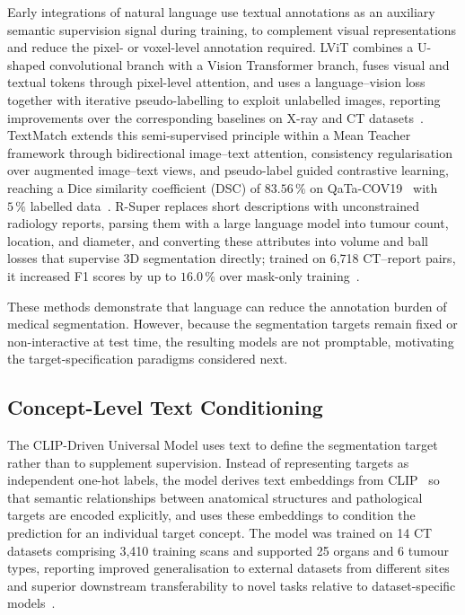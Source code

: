 Early integrations of natural language use textual annotations as an auxiliary semantic supervision signal during training, to complement visual representations and reduce the pixel- or voxel-level annotation required. LViT combines a U-shaped convolutional branch with a Vision Transformer branch, fuses visual and textual tokens through pixel-level attention, and uses a language--vision loss together with iterative pseudo-labelling to exploit unlabelled images, reporting improvements over the corresponding baselines on X-ray and CT datasets~\cite{li2023lvitlanguagemeetsvision}. TextMatch extends this semi-supervised principle within a Mean Teacher framework through bidirectional image--text attention, consistency regularisation over augmented image--text views, and pseudo-label guided contrastive learning, reaching a Dice similarity coefficient (DSC) of $83.56\,\%$ on QaTa-COV19~\cite{Degerli_2022} with $5\,\%$ labelled data~\cite{textmatch2024}. R-Super replaces short descriptions with unconstrained radiology reports, parsing them with a large language model into tumour count, location, and diameter, and converting these attributes into volume and ball losses that supervise 3D segmentation directly; trained on 6,718 CT--report pairs, it increased F1 scores by up to $16.0\,\%$ over mask-only training~\cite{bassi2025learningsegmentationradiologyreports}.

These methods demonstrate that language can reduce the annotation burden of medical segmentation. However, because the segmentation targets remain fixed or non-interactive at test time, the resulting models are not promptable, motivating the target-specification paradigms considered next.

\subsection{Concept-Level Text Conditioning}
\label{subsec:concept-text}

The CLIP-Driven Universal Model uses text to define the segmentation target rather than to supplement supervision. Instead of representing targets as independent one-hot labels, the model derives text embeddings from CLIP~\cite{radford2021learningtransferablevisualmodels} so that semantic relationships between anatomical structures and pathological targets are encoded explicitly, and uses these embeddings to condition the prediction for an individual target concept. The model was trained on 14 CT datasets comprising 3,410 training scans and supported 25 organs and 6 tumour types, reporting improved generalisation to external datasets from different sites and superior downstream transferability to novel tasks relative to dataset-specific models~\cite{Liu_2023}.

